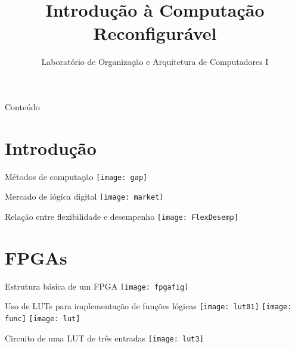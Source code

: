 

\title{Introdução à Computação Reconfigurável}

\subtitle{Laboratório de Organização e Arquitetura de Computadores I}



\begin{frame}
	\titlepage
\end{frame} 

\begin{frame}{Conteúdo}
	\tableofcontents
\end{frame}

\section{Introdução} %

\begin{frame}{Métodos de computação \cite{menotti2010.phd}} 
	\center	\texttt{[image: gap]}
\end{frame}

\begin{frame}{Mercado de lógica digital \cite{hamblen}} 
	\center	\texttt{[image: market]}
\end{frame}

\begin{frame}{Relação entre flexibilidade e desempenho \cite{bobda}} 
	\center	\texttt{[image: FlexDesemp]}
\end{frame}

\section{FPGAs} %

\begin{frame}{Estrutura básica de um FPGA} 
	\center	\texttt{[image: fpgafig]}
\end{frame}

\begin{frame}{Uso de LUTs para implementação de funções lógicas} 
	\center	
    \texttt{[image: lut01]}
	\texttt{[image: func]}
    \texttt{[image: lut]}
\end{frame}

\begin{frame}{Circuito de uma LUT de três entradas} 
	\center	\texttt{[image: lut3]}
\end{frame}

